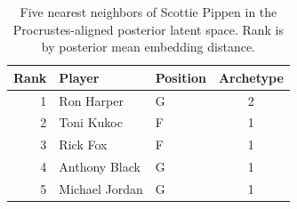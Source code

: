 \begin{table}[htbp]
  \centering\small
  \begin{tabular}{rllc}
    \toprule
    Rank & Player & Position & Archetype \\
    \midrule
    1 & Ron Harper & G & 2 \\
    2 & Toni Kukoc & F & 1 \\
    3 & Rick Fox & F & 1 \\
    4 & Anthony Black & G & 1 \\
    5 & Michael Jordan & G & 1 \\
    \bottomrule
  \end{tabular}
  \caption{Five nearest neighbors of Scottie Pippen in the Procrustes-aligned posterior latent space. Rank is by posterior mean embedding distance.}
  \label{tab:Scottie_Pippen_neighbors}
\end{table}

